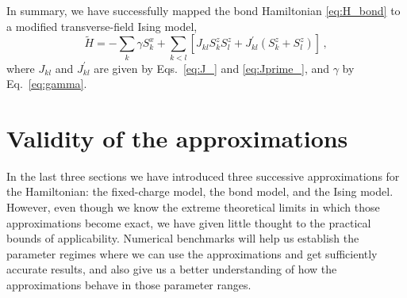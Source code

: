 In summary, we have successfully mapped the  bond Hamiltonian
\eqref{eq:H_bond} to a modified transverse-field Ising model,
\begin{equation}
  \label{eq:H_Ising}
  \tilde{H}
  =
  - \sum_k \gamma S^x_k
  + \sum_{k<l}
    \left[
      J_{kl} S^z_k S^z_l + 
      J^{\prime}_{kl} \left( S^z_k + S^z_l \right)
    \right] \, ,
\end{equation}
where $J_{kl}$ and $J^{\prime}_{kl}$ are given by Eqs.~\eqref{eq:J_} and
\eqref{eq:Jprime_}, and $\gamma$ by Eq.~\eqref{eq:gamma}.

\clearpage


\section{\label{sec:validity_of_the_approximations}Validity of the approximations}

In the last three sections we have introduced three successive approximations
for the  Hamiltonian: the fixed-charge model, the bond model, and the
Ising model. However, even though we know the extreme theoretical limits in
which those approximations become exact, we have given little thought to the
practical bounds of applicability. Numerical benchmarks will help us establish
the parameter regimes where we can use the approximations and get sufficiently
accurate results, and also give us a better understanding of how the
approximations behave in those parameter ranges.

